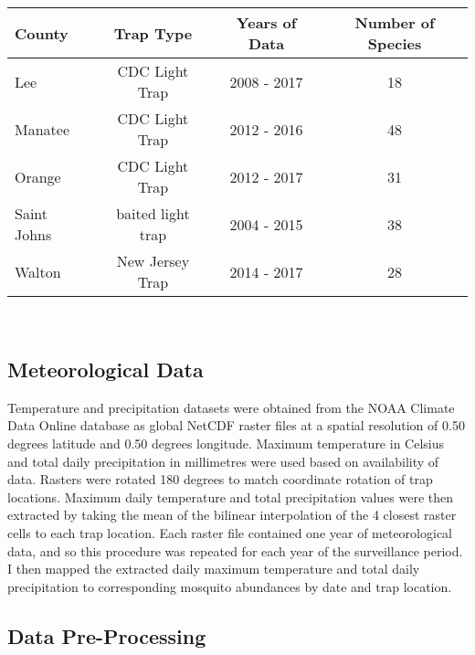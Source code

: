 \begin{center}
	\begin{tabularx}{7in}{ | L{0.5} | C{0.5} | C{0.5} | C{0.5} |}
		\hline
		\textbf{County} & \textbf{Trap Type} &\textbf{Years of Data} & \textbf{Number of Species}\\\hline
		Lee & CDC Light Trap & 2008 - 2017 & 18\\
		Manatee & CDC Light Trap & 2012 - 2016 & 48\\
		Orange & CDC Light Trap & 2012 - 2017 & 31\\
		Saint Johns & baited light trap & 2004 - 2015 & 38\\
		Walton & New Jersey Trap & 2014 - 2017 & 28\\\hline 
	\end{tabularx}\\
\end{center}	

\subsection{Meteorological Data}

Temperature and precipitation datasets were obtained from the NOAA Climate Data Online database as global NetCDF raster files at a spatial resolution of 0.50 degrees latitude and 0.50 degrees longitude. Maximum temperature in Celsius and total daily precipitation in millimetres were used based on availability of data. Rasters were rotated 180 degrees to match coordinate rotation of trap locations. Maximum daily temperature and total precipitation values were then extracted by taking the mean of the bilinear interpolation of the 4 closest raster cells to each trap location. Each raster file contained one year of meteorological data, and so this procedure was repeated for each year of the surveillance period. I then mapped the extracted daily maximum temperature and total daily precipitation to corresponding mosquito abundances by date and trap location. 


\subsection{Data Pre-Processing}

